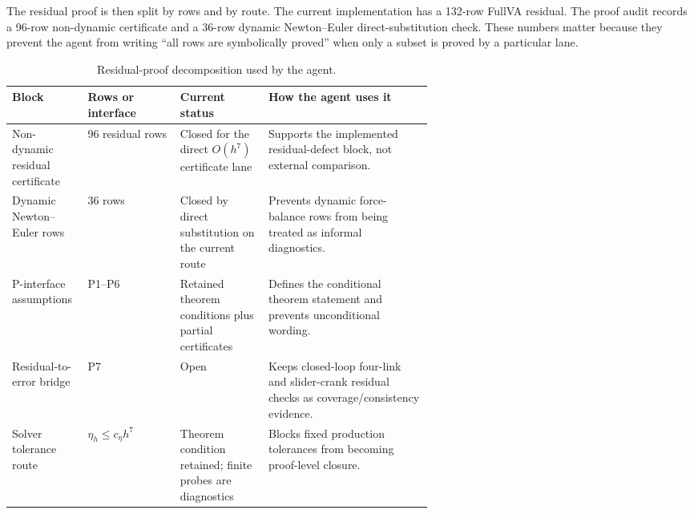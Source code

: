\documentclass[10pt]{article}
\begin{document}
The residual proof is then split by rows and by route. The current
implementation has a 132-row FullVA residual. The proof audit records a
96-row non-dynamic certificate and a 36-row dynamic Newton--Euler
direct-substitution check. These numbers matter because they prevent the
agent from writing ``all rows are symbolically proved'' when only a subset is
proved by a particular lane.

\begin{table}[H]
\centering
\caption{Residual-proof decomposition used by the agent.}
\label{tab:proof_rows}
\small
\begin{tabularx}{\linewidth}{p{0.18\linewidth}p{0.22\linewidth}p{0.21\linewidth}Y}
\toprule
\textbf{Block} & \textbf{Rows or interface} & \textbf{Current status} & \textbf{How the agent uses it} \\
\midrule
Non-dynamic residual certificate & 96 residual rows & Closed for the direct $O(h^7)$ certificate lane & Supports the implemented residual-defect block, not external comparison. \\
Dynamic Newton--Euler rows & 36 rows & Closed by direct substitution on the current route & Prevents dynamic force-balance rows from being treated as informal diagnostics. \\
P-interface assumptions & P1--P6 & Retained theorem conditions plus partial certificates & Defines the conditional theorem statement and prevents unconditional wording. \\
Residual-to-error bridge & P7 & Open & Keeps closed-loop four-link and slider-crank residual checks as coverage/consistency evidence. \\
Solver tolerance route & $\eta_h \le c_{\eta}h^7$ & Theorem condition retained; finite probes are diagnostics & Blocks fixed production tolerances from becoming proof-level closure. \\
\bottomrule
\end{tabularx}
\end{table}
\end{document}
